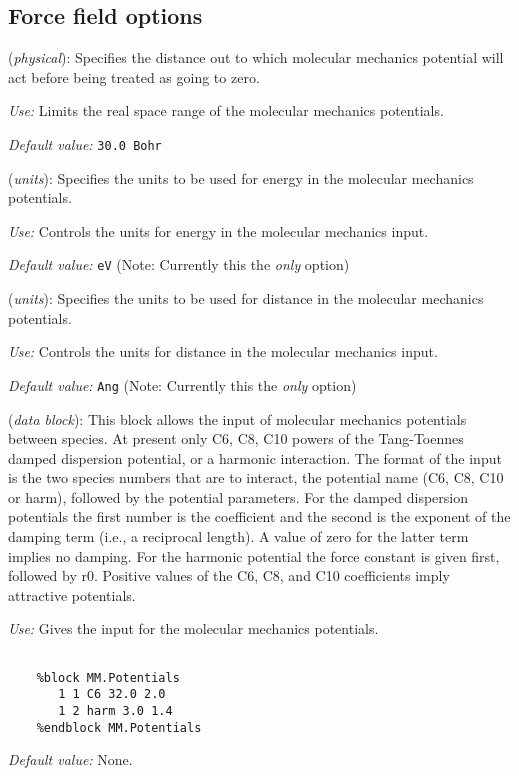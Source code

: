 \documentclass[11pt]{article}
\begin{document}
\vspace{5pt}
\subsection{Force field options}

\begin{description}
\itemsep 10pt
\parsep 0pt

\item[{\bf MM.Cutoff}] ({\it physical}):  Specifies the distance out to which molecular mechanics
potential will act before being treated as going to zero.

{\it Use:} Limits the real space range of the molecular mechanics
potentials.

{\it Default value:}  {\tt 30.0 Bohr}

\item[{\bf MM.UnitsEnergy}] ({\it units}):  Specifies the units to be used for energy in the 
molecular mechanics potentials.

{\it Use:} Controls the units for energy in the molecular mechanics input.

{\it Default value:}  {\tt eV} (Note: Currently this the {\em only} option)

\item[{\bf MM.UnitsDistance}] ({\it units}):  Specifies the units to be used for distance in the 
molecular mechanics potentials.

{\it Use:} Controls the units for distance in the molecular mechanics input.

{\it Default value:}  {\tt Ang} (Note: Currently this the {\em only} option)

\item[{\bf MM.Potentials}] ({\it data block}):
 This block allows the input
of molecular mechanics potentials between species. At present only C6,
C8, C10 powers of the Tang-Toennes damped dispersion potential, or a
harmonic interaction. The format of the input is the two species
numbers that are to interact, the potential name (C6, C8, C10 or
harm), followed by the potential parameters. For the damped dispersion
potentials the first number is the coefficient and the second is the
exponent of the damping term (i.e., a reciprocal length). A value of
zero for the latter term implies no damping. For the harmonic
potential the force constant is given first, followed by r0. Positive
values of the C6, C8, and C10 coefficients imply attractive
potentials.

{\it Use:} Gives the input for the molecular mechanics potentials.

\begin{verbatim}

    %block MM.Potentials
       1 1 C6 32.0 2.0
       1 2 harm 3.0 1.4
    %endblock MM.Potentials

\end{verbatim}

{\it Default value:}  None.

\end{description}
\end{document}
